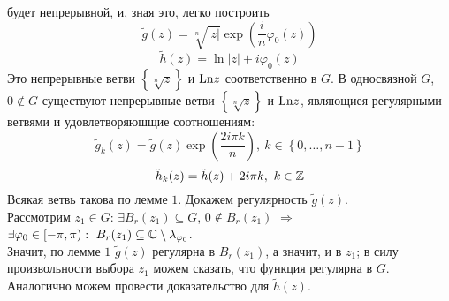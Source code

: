 будет непрерывной, и, зная это, легко построить
\begin{equation}\label{(15.10)}
    \tilde{g}(z) = \sqrt[n]{\left| z \right|} \exp\left( \frac{i}{n} \varphi_0(z) \right)
\end{equation}
\begin{equation}\label{(15.11)}
    \tilde{h}(z) = \ln \left| z \right| + i \varphi_0(z)
\end{equation}
Это непрерывные ветви $\left\{ \sqrt[n]{z} \right\}$ и $\mathrm{Ln} z$ соответственно в
$G$.
\theorem
В односвязной $G$, $0 \not \in G$ существуют непрерывные ветви $\left\{
    \sqrt[n]{z} \right\}$ и $\mathrm{Ln} z$, являющиея регулярными ветвями и
удовлетворяюшщие соотношениям:
\begin{equation}\label{(15.12)}
    \tilde{g}_k(z) = \tilde{g}(z)\exp\left( \frac{2i\pi k}{n} \right), \ k \in \left\{ 0, \dots, n-1 \right\}
\end{equation}
\begin{equation}\label{(15.13)}
    \tilde{h}_k(z) = \tilde{h}(z) + 2 i \pi k, \ k \in \mathbb{Z}
\end{equation}
\pr
Всякая ветвь такова по лемме $1$. Докажем регулярность $\tilde{g}(z)$.
\\
Рассмотрим $z_1 \in G$: $\exists B_r(z_1) \subseteq G$, $0 \not \in B_r(z_1)$
$\Rightarrow$ $\exists \varphi_0 \in [-\pi, \pi): \ B_r(z_1) \subseteq \mathbb{C}
\setminus \lambda_{\varphi_0}$.
\\
Значит, по лемме $1$ $\tilde{g}(z)$ регулярна в $B_r(z_1)$, а значит, и в $z_1$;
в силу произвольности выбора $z_1$ можем сказать, что функция регулярна в $G$.
\\
Аналогично можем провести доказательство для $\tilde{h}(z)$.
